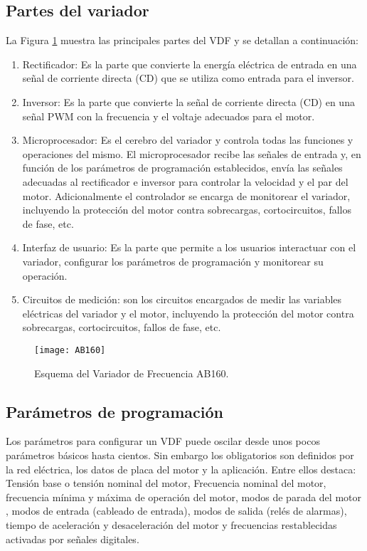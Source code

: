 \subsection{Partes del variador}

La Figura \ref{fig:ab160} muestra las principales partes del VDF y se detallan a continuación:
\begin{enumerate}
	\item Rectificador: Es la parte que convierte la energía eléctrica de entrada en una señal de corriente directa (CD) que se utiliza como entrada para el inversor.
	
	\item Inversor: Es la parte que convierte la señal de corriente directa (CD) en una señal PWM con la frecuencia y el voltaje adecuados para el motor.
	
	\item Microprocesador: Es el cerebro del variador y controla todas las funciones y operaciones del mismo. El microprocesador recibe las señales de entrada y, en función de los parámetros de programación establecidos, envía las señales adecuadas al rectificador e inversor para controlar la velocidad y el par del motor.
	Adicionalmente el controlador se encarga de monitorear el variador, incluyendo la protección del motor contra sobrecargas, cortocircuitos, fallos de fase, etc.
	
	\item Interfaz de usuario: Es la parte que permite a los usuarios interactuar con el variador, configurar los parámetros de programación y monitorear su operación.
	
	\item Circuitos de medición: son los circuitos encargados de medir las variables eléctricas del variador y el motor, incluyendo la protección del motor contra sobrecargas, cortocircuitos, fallos de fase, etc.
	
\end{enumerate}

\begin{figure}
	\centering
	\texttt{[image: AB160]}
	\caption{Esquema del Variador de Frecuencia AB160.\cite{AB160} }
	\label{fig:ab160}
\end{figure}

\subsection{Parámetros de programación}

 Los parámetros para configurar un VDF puede oscilar desde unos pocos parámetros básicos hasta cientos. Sin embargo los obligatorios son definidos por la red eléctrica, los datos de placa del motor y la aplicación. Entre ellos destaca: Tensión base o tensión nominal del motor, Frecuencia nominal del motor, frecuencia mínima y máxima de operación del motor,  modos de parada del motor , modos de entrada (cableado de entrada), modos de salida (relés de alarmas), tiempo de aceleración y desaceleración del motor y frecuencias restablecidas activadas por señales digitales.
 
